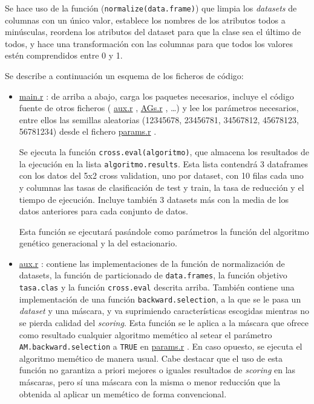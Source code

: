 \documentclass[a4paper,11pt]{article}
\newcommand{\hrefr}[1]{
\href{../bin/#1}{#1}
}
\begin{document}
Se hace uso de la función (\texttt{normalize(data.frame)}) que limpia los \textit{datasets} de columnas con
un único valor, establece los nombres de los atributos todos a minúsculas, reordena los atributos del dataset para que
la clase sea el último de todos, y hace una transformación con las columnas para que todos los valores estén comprendidos
entre 0 y 1.

Se describe a continuación un esquema de los ficheros de código:
\begin{itemize}
 \item \hrefr{main.r}: de arriba a abajo, carga los paquetes necesarios, incluye el código fuente de otros ficheros
  (\hrefr{aux.r}, \hrefr{AGs.r}, \ldots) y lee los parámetros necesarios, entre ellos las 
  semillas aleatorias (12345678, 23456781, 34567812, 45678123, 56781234) desde el fichero \hrefr{params.r}.
  
  Se ejecuta la función \texttt{cross.eval(algoritmo)}, que almacena los resultados de la ejecución en la lista
  \texttt{algoritmo.results}. Esta lista contendrá 3 dataframes con los datos del 5x2 cross validation, uno por dataset, 
  con 10 filas cada uno  y columnas las tasas de clasificación de test y train, la tasa de reducción y el tiempo de 
  ejecución. Incluye también 3 datasets más con la media de los datos anteriores para cada conjunto de datos.
 
  Esta función se ejecutará pasándole como parámetros la función del algoritmo genético generacional y la del estacionario.
  
 \item \hrefr{aux.r}: contiene las implementaciones de la función de normalización de datasets, la función de
 particionado de \texttt{data.frames}, la función objetivo \texttt{tasa.clas} y la función \texttt{cross.eval}
 descrita arriba. También contiene una implementación de una función \texttt{backward.selection}, a la que se le pasa
 un \textit{dataset} y una máscara, y va suprimiendo características escogidas mientras no se pierda calidad del \textit{scoring}.
 Esta función se le aplica a la máscara que ofrece como resultado cualquier algoritmo memético al setear el parámetro \texttt{AM.backward.selection} a \texttt{TRUE} en \hrefr{params.r}. En caso opuesto, se ejecuta
 el algoritmo memético de manera usual. Cabe destacar que el uso de esta función no garantiza a priori mejores o iguales
 resultados de \textit{scoring} en las máscaras, pero sí una máscara con la misma o menor reducción que la obtenida al aplicar
 un memético de forma convencional.
 

\end{itemize}
\end{document}
